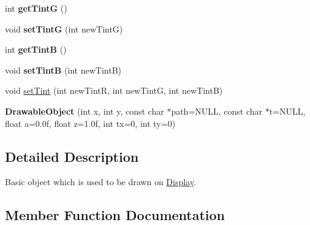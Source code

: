 \begin{DoxyCompactItemize}
\item 
int {\bfseries get\+TintG} ()\hypertarget{classDrawableObject_a94e7b6e47036ed97b21dd896468783b5}{}\label{classDrawableObject_a94e7b6e47036ed97b21dd896468783b5}

\item 
void {\bfseries set\+TintG} (int new\+TintG)\hypertarget{classDrawableObject_a81a483c62bd4dabef7903e85a88dbff3}{}\label{classDrawableObject_a81a483c62bd4dabef7903e85a88dbff3}

\item 
int {\bfseries get\+TintB} ()\hypertarget{classDrawableObject_aa4edfb17d39895558958c096572ab2ac}{}\label{classDrawableObject_aa4edfb17d39895558958c096572ab2ac}

\item 
void {\bfseries set\+TintB} (int new\+TintB)\hypertarget{classDrawableObject_ae0f50ac01b3d4192abdb5dd89de805a2}{}\label{classDrawableObject_ae0f50ac01b3d4192abdb5dd89de805a2}

\item 
void \hyperlink{classDrawableObject_a173f6a4ac4aa12157cccef15089db4d3}{set\+Tint} (int new\+TintR, int new\+TintG, int new\+TintB)
\item 
{\bfseries Drawable\+Object} (int x, int y, const char $\ast$path=N\+U\+LL, const char $\ast$t=N\+U\+LL, float a=0.\+0f, float z=1.\+0f, int tx=0, int ty=0)\hypertarget{classDrawableObject_adf15c4092f15bd7d42edfc2cdda6cac7}{}\label{classDrawableObject_adf15c4092f15bd7d42edfc2cdda6cac7}

\end{DoxyCompactItemize}


\subsection{Detailed Description}
Basic object which is used to be drawn on \hyperlink{classDisplay}{Display}. 

\subsection{Member Function Documentation}
